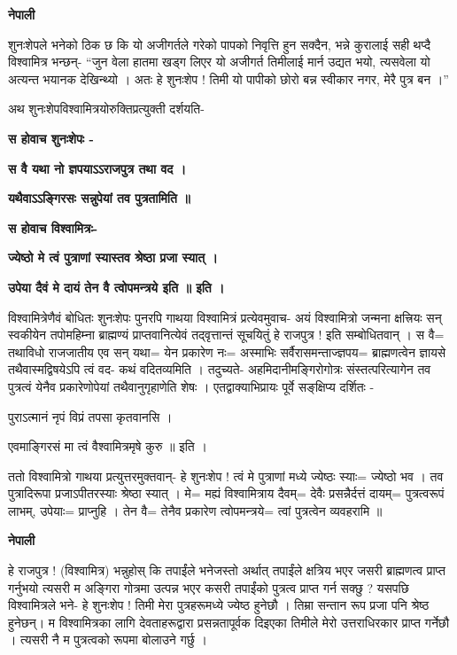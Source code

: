 \documentclass[11pt, a5paper]{article}
\begin{document}
\textbf{नेपाली}

शुनःशेपले भनेको ठिक छ कि यो अजीगर्तले गरेको पापको निवृत्ति हुन सक्दैन, भन्ने कुरालाई सही थप्दै विश्वामित्र भन्छन्- “जुन वेला हातमा खड्‍ग लिएर यो अजीगर्त तिमीलाई मार्न उद्यत भयो, त्यसवेला यो अत्यन्त भयानक देखिन्थ्यो । अतः हे शुनःशेप ! तिमी यो पापीको छोरो बन्न स्वीकार नगर, मेरै पुत्र बन ।”

अथ शुनःशेपविश्वामित्रयोरुक्तिप्रत्युक्ती दर्शयति-

\textbf{स होवाच शुनःशेपः -}

\textbf{स वै यथा नो ज्ञपयाऽऽराजपुत्र तथा वद ।}

\textbf{यथैवाऽऽङ्गिरसः सन्नुपेयां तव पुत्रतामिति ॥}

\textbf{स होवाच विश्वामित्रः-}

\textbf{ज्येष्ठो मे त्वं पुत्राणां स्यास्तव श्रेष्ठा प्रजा स्यात् ।}

\textbf{उपेया दैवं मे दायं तेन वै त्वोपमन्त्रये इति ॥ इति ।}

विश्वामित्रेणैवं बोधितः शुनःशेपः पुनरपि गाथया विश्वामित्रं प्रत्येवमुवाच- अयं विश्वामित्रो जन्मना क्षत्त्रियः सन् स्वकीयेन तपोमहिम्ना ब्राह्मण्यं प्राप्तवानित्येवं तद्‌वृत्तान्तं सूचयितुं हे राजपुत्र ! इति सम्बोधितवान् । स वै= तथाविधो राजजातीय एव सन् यथा= येन प्रकारेण नः= अस्माभिः सर्वैरासमन्ताज्ज्ञपय= ब्राह्मणत्वेन ज्ञायसे तथैवास्मद्विषयेऽपि त्वं वद- कथं वदितव्यमिति । तदुच्यते- अहमिदानीमङ्गिरोगोत्रः संस्तत्परित्यागेन तव पुत्रत्वं येनैव प्रकारेणोपेयां तथैवानुगृहाणेति शेषः । एतद्वाक्याभिप्रायः पूर्वे सङ्‌क्षिप्य दर्शितः -

पुराऽत्मानं नृपं विप्रं तपसा कृतवानसि ।

एवमाङ्गिरसं मा त्वं वैश्वामित्रमृषे कुरु ॥ इति ।

ततो विश्वामित्रो गाथया प्रत्युत्तरमुक्तवान्- हे शुनःशेप ! त्वं मे पुत्राणां मध्ये ज्येष्ठः स्याः= ज्येष्ठो भव । तव पुत्रादिरूपा प्रजाऽपीतरस्याः श्रेष्ठा स्यात् । मे= मह्यं विश्वामित्राय दैवम्= देवैः प्रसन्नैर्दत्तं दायम्= पुत्रत्वरूपं लाभम्, उपेयाः= प्राप्नुहि । तेन वै= तेनैव प्रकारेण त्वोपमन्त्रये= त्वां पुत्रत्वेन व्यवहरामि ॥

\textbf{नेपाली}

हे राजपुत्र ! (विश्वामित्र) भन्नुहोस् कि तपाईंले भनेजस्तो अर्थात् तपाईंले क्षत्रिय भएर जसरी ब्राह्मणत्व प्राप्त गर्नुभयो त्यसरी म अङ्गिरा गोत्रमा उत्पन्न भएर कसरी तपाईंको पुत्रत्व प्राप्त गर्न सक्छु ? यसपछि विश्वामित्रले भने- हे शुनःशेप ! तिमी मेरा पुत्रहरूमध्ये ज्येष्ठ हुनेछौ । तिम्रा सन्तान रूप प्रजा पनि श्रेष्ठ हुनेछन्। म विश्वामित्रका लागि देवताहरूद्वारा प्रसन्नतापूर्वक दिइएका तिमीले मेरो उत्तराधिरकार प्राप्त गर्नेछौ । त्यसरी नै म पुत्रत्वको रूपमा बोलाउने गर्छु ।
\end{document}
